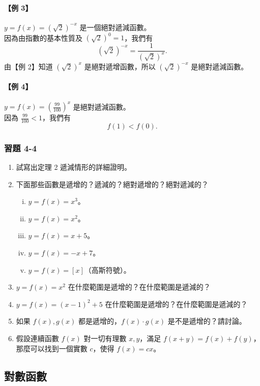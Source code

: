 \paragraph{【例 3】} $y = f(x) = (\sqrt{2})^{-x}$ 是一個絕對遞減函數。\\
因為由指數的基本性質及 $(\sqrt{2})^0 = 1$，我們有
\[
(\sqrt{2})^{-x} = \frac{1}{(\sqrt{2})^x}.
\]
由【例 2】知道 $(\sqrt{2})^x$ 是絕對遞增函數，所以 $(\sqrt{2})^{-x}$ 是絕對遞減函數。

\paragraph{【例 4】} $y = f(x) = \left(\frac{99}{100}\right)^x$ 是絕對遞減函數。\\
因為 $\frac{99}{100} < 1$，我們有
\[
f(1) < f(0).
\]

\subsubsection*{習題 4-4}

\begin{enumerate}
    \item 試寫出定理 2 遞減情形的詳細證明。
    \item 下面那些函數是遞增的？遞減的？絕對遞增的？絕對遞減的？
    \begin{enumerate}[(i)]
        \item $y = f(x) = x^3$。
        \item $y = f(x) = x^2$。
        \item $y = f(x) = x+5$。
        \item $y = f(x) = -x+7$。
        \item $y = f(x) = [x]$（高斯符號）。
    \end{enumerate}
    \item $y = f(x) = x^2$ 在什麼範圍是遞增的？在什麼範圍是遞減的？
    \item $y = f(x) = (x-1)^2+5$ 在什麼範圍是遞增的？在什麼範圍是遞減的？
    \item 如果 $f(x), g(x)$ 都是遞增的，$f(x)\cdot g(x)$ 是不是遞增的？請討論。
    \item 假設連續函數 $f(x)$ 對一切有理數 $x, y$，滿足 $f(x+y) = f(x)+f(y)$，那麼可以找到一個實數 $c$，使得 $f(x) = cx$。
\end{enumerate}

\subsection{對數函數}\label{sec:b2_4-3}

